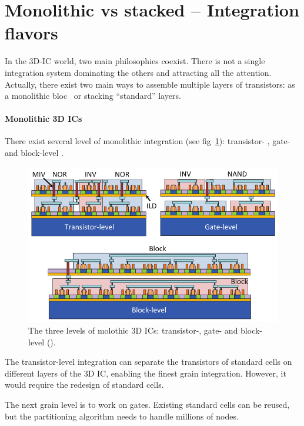 \documentclass[11pt,a4paper]{report} %
\theoremstyle{customdef}
\begin{document}
\section{Monolithic vs stacked -- Integration flavors}\label{sec:int-flav}
In the 3D-IC world, two main philosophies coexist.
There is not a single integration system dominating the others and attracting all the attention.
Actually, there exist two main ways to assemble multiple layers of transistors: as a monolithic bloc~\citep[chap. 2]{Tan2008} or stacking “standard” layers\citep{Tan2008}.

\paragraph{Monolithic 3D ICs}
There exist several level of monolithic integration (see fig~\ref{fig:m3d}): transistor- \citep{Lee2013, Samal2014}, gate- \citep{Panth, Panth2014} and block-level \citep{Panth2013}.

\begin{figure}
	\centering
	\includegraphics[width=.7\textwidth]{img/M3D-Lim.png}
	\caption{The three levels of molothic 3D ICs: transistor-, gate- and block-level (\citet{Panth}).}
	\label{fig:m3d}
\end{figure}

The transistor-level integration can separate the transistors of standard cells on different layers of the 3D IC, enabling the finest grain integration.
However, it would require the redesign of standard cells.

The next grain level is to work on gates. %
Existing standard cells can be reused, but the partitioning algorithm needs to handle millions of nodes.
\end{document}
